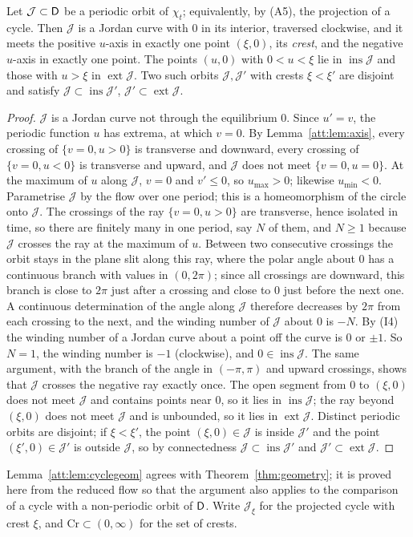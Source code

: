 \begin{lemma}\label{att:lem:cyclegeom}
Let $\mathcal J\subset\mathsf D$ be a periodic orbit of $\chi_t$; equivalently, by (A5), the projection of a cycle. Then $\mathcal J$ is a Jordan curve with $0$ in its interior, traversed clockwise, and it meets the positive $u$-axis in exactly one point $(\xi,0)$, its \emph{crest}, and the negative $u$-axis in exactly one point. The points $(u,0)$ with $0<u<\xi$ lie in $\operatorname{ins}\mathcal J$ and those with $u>\xi$ in $\operatorname{ext}\mathcal J$. Two such orbits $\mathcal J,\mathcal J'$ with crests $\xi<\xi'$ are disjoint and satisfy $\mathcal J\subset\operatorname{ins}\mathcal J'$, $\mathcal J'\subset\operatorname{ext}\mathcal J$.
\end{lemma}
\begin{proof}
$\mathcal J$ is a Jordan curve not through the equilibrium $0$. Since $u'=v$, the periodic function $u$ has extrema, at which $v=0$. By Lemma~\ref{att:lem:axis}, every crossing of $\{v=0,u>0\}$ is transverse and downward, every crossing of $\{v=0,u<0\}$ is transverse and upward, and $\mathcal J$ does not meet $\{v=0,u=0\}$. At the maximum of $u$ along $\mathcal J$, $v=0$ and $v'\le0$, so $u_{\max}>0$; likewise $u_{\min}<0$. Parametrise $\mathcal J$ by the flow over one period; this is a homeomorphism of the circle onto $\mathcal J$. The crossings of the ray $\{v=0,u>0\}$ are transverse, hence isolated in time, so there are finitely many in one period, say $N$ of them, and $N\ge1$ because $\mathcal J$ crosses the ray at the maximum of $u$. Between two consecutive crossings the orbit stays in the plane slit along this ray, where the polar angle about $0$ has a continuous branch with values in $(0,2\pi)$; since all crossings are downward, this branch is close to $2\pi$ just after a crossing and close to $0$ just before the next one. A continuous determination of the angle along $\mathcal J$ therefore decreases by $2\pi$ from each crossing to the next, and the winding number of $\mathcal J$ about $0$ is $-N$. By (I4) the winding number of a Jordan curve about a point off the curve is $0$ or $\pm1$. So $N=1$, the winding number is $-1$ (clockwise), and $0\in\operatorname{ins}\mathcal J$. The same argument, with the branch of the angle in $(-\pi,\pi)$ and upward crossings, shows that $\mathcal J$ crosses the negative ray exactly once. The open segment from $0$ to $(\xi,0)$ does not meet $\mathcal J$ and contains points near $0$, so it lies in $\operatorname{ins}\mathcal J$; the ray beyond $(\xi,0)$ does not meet $\mathcal J$ and is unbounded, so it lies in $\operatorname{ext}\mathcal J$. Distinct periodic orbits are disjoint; if $\xi<\xi'$, the point $(\xi,0)\in\mathcal J$ is inside $\mathcal J'$ and the point $(\xi',0)\in\mathcal J'$ is outside $\mathcal J$, so by connectedness $\mathcal J\subset\operatorname{ins}\mathcal J'$ and $\mathcal J'\subset\operatorname{ext}\mathcal J$.
\end{proof}
Lemma~\ref{att:lem:cyclegeom} agrees with Theorem~\ref{thm:geometry}; it is proved here from the reduced flow so that the argument also applies to the comparison of a cycle with a non-periodic orbit of $\mathsf D$. Write $\mathcal J_\xi$ for the projected cycle with crest $\xi$, and $\mathrm{Cr}\subset(0,\infty)$ for the set of crests.

